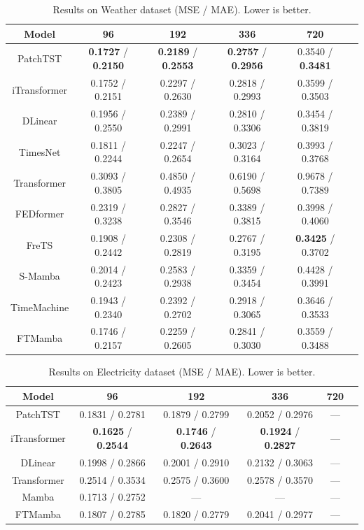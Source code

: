 \documentclass[electronics,article,submit,pdftex,moreauthors]{Definitions/mdpi}
\begin{document}
\begin{table}[H]
\caption{Results on Weather dataset (MSE / MAE). Lower is better.\label{tab:weather}}
\begin{tabularx}{\textwidth}{CCCCCC}
\toprule
\textbf{Model} & \textbf{96} & \textbf{192} & \textbf{336} & \textbf{720} \\
\midrule
PatchTST      & \textbf{0.1727} / \textbf{0.2150}  & \textbf{0.2189} / \textbf{0.2553}  & \textbf{0.2757} / \textbf{0.2956}  & 0.3540 / \textbf{0.3481}  \\
iTransformer  & 0.1752 / 0.2151  & 0.2297 / 0.2630  & 0.2818 / 0.2993  & 0.3599 / 0.3503  \\
DLinear       & 0.1956 / 0.2550  & 0.2389 / 0.2991  & 0.2810 / 0.3306  & 0.3454 / 0.3819  \\
TimesNet      & 0.1811 / 0.2244  & 0.2247 / 0.2654  & 0.3023 / 0.3164  & 0.3993 / 0.3768  \\
Transformer   & 0.3093 / 0.3805  & 0.4850 / 0.4935  & 0.6190 / 0.5698  & 0.9678 / 0.7389  \\
FEDformer     & 0.2319 / 0.3238  & 0.2827 / 0.3546  & 0.3389 / 0.3815  & 0.3998 / 0.4060  \\
FreTS         & 0.1908 / 0.2442  & 0.2308 / 0.2819  & 0.2767 / 0.3195  & \textbf{0.3425} / 0.3702  \\
S-Mamba       & 0.2014 / 0.2423  & 0.2583 / 0.2938  & 0.3359 / 0.3454  & 0.4428 / 0.3991  \\
TimeMachine   & 0.1943 / 0.2340  & 0.2392 / 0.2702  & 0.2918 / 0.3065  & 0.3646 / 0.3533  \\
FTMamba       & 0.1746 / 0.2157  & 0.2259 / 0.2605  & 0.2841 / 0.3030  & 0.3559 / 0.3488  \\
\bottomrule
\end{tabularx}
\end{table}

\begin{table}[H]
\caption{Results on Electricity dataset (MSE / MAE). Lower is better.\label{tab:large_scale}}
\begin{tabularx}{\textwidth}{CCCCCC}
\toprule
\textbf{Model} & \textbf{96} & \textbf{192} & \textbf{336} & \textbf{720} \\
\midrule
PatchTST      & 0.1831 / 0.2781  & 0.1879 / 0.2799  & 0.2052 / 0.2976  & ---  \\
iTransformer  & \textbf{0.1625} / \textbf{0.2544}  & \textbf{0.1746} / \textbf{0.2643}  & \textbf{0.1924} / \textbf{0.2827}  & ---  \\
DLinear       & 0.1998 / 0.2866  & 0.2001 / 0.2910  & 0.2132 / 0.3063  & ---  \\
Transformer   & 0.2514 / 0.3534  & 0.2575 / 0.3600  & 0.2578 / 0.3570  & ---  \\
Mamba         & 0.1713 / 0.2752  & --- & --- & ---  \\
FTMamba       & 0.1807 / 0.2785  & 0.1820 / 0.2779  & 0.2041 / 0.2977  & ---  \\
\bottomrule
\end{tabularx}
\end{table}
\end{document}
